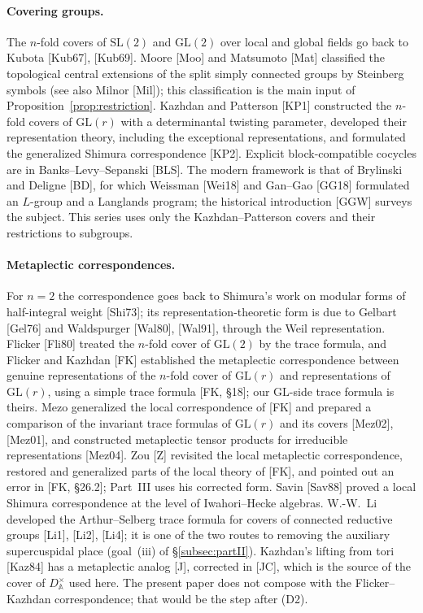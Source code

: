 \documentclass[12pt]{article}
\newcommand{\A}{\mathbb{A}}
\newcommand{\GL}{\mathrm{GL}}
\newcommand{\SL}{\mathrm{SL}}
\theoremstyle{plain}
\theoremstyle{definition}
\begin{document}
\paragraph{Covering groups.} The $n$-fold covers of $\SL(2)$ and $\GL(2)$ over local and global fields go back to Kubota [Kub67], [Kub69]. Moore [Moo] and Matsumoto [Mat] classified the topological central extensions of the split simply connected groups by Steinberg symbols (see also Milnor [Mil]); this classification is the main input of Proposition~\ref{prop:restriction}. Kazhdan and Patterson [KP1] constructed the $n$-fold covers of $\GL(r)$ with a determinantal twisting parameter, developed their representation theory, including the exceptional representations, and formulated the generalized Shimura correspondence [KP2]. Explicit block-compatible cocycles are in Banks--Levy--Sepanski [BLS]. The modern framework is that of Brylinski and Deligne [BD], for which Weissman [Wei18] and Gan--Gao [GG18] formulated an $L$-group and a Langlands program; the historical introduction [GGW] surveys the subject. This series uses only the Kazhdan--Patterson covers and their restrictions to subgroups.

\paragraph{Metaplectic correspondences.} For $n=2$ the correspondence goes back to Shimura's work on modular forms of half-integral weight [Shi73]; its representation-theoretic form is due to Gelbart [Gel76] and Waldspurger [Wal80], [Wal91], through the Weil representation. Flicker [Fli80] treated the $n$-fold cover of $\GL(2)$ by the trace formula, and Flicker and Kazhdan [FK] established the metaplectic correspondence between genuine representations of the $n$-fold cover of $\GL(r)$ and representations of $\GL(r)$, using a simple trace formula [FK, \S18]; our $\GL$-side trace formula is theirs. Mezo generalized the local correspondence of [FK] and prepared a comparison of the invariant trace formulas of $\GL(r)$ and its covers [Mez02], [Mez01], and constructed metaplectic tensor products for irreducible representations [Mez04]. Zou [Z] revisited the local metaplectic correspondence, restored and generalized parts of the local theory of [FK], and pointed out an error in [FK, \S26.2]; Part~III uses his corrected form. Savin [Sav88] proved a local Shimura correspondence at the level of Iwahori--Hecke algebras. W.-W.~Li developed the Arthur--Selberg trace formula for covers of connected reductive groups [Li1], [Li2], [Li4]; it is one of the two routes to removing the auxiliary supercuspidal place (goal~(iii) of \S\ref{subsec:partII}). Kazhdan's lifting from tori [Kaz84] has a metaplectic analog [J], corrected in [JC], which is the source of the cover of $D^\times_{\A}$ used here. The present paper does not compose with the Flicker--Kazhdan correspondence; that would be the step after (D2).
\end{document}
